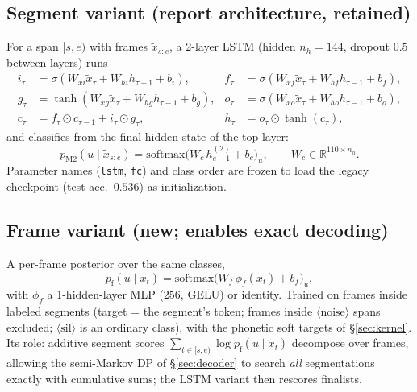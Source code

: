 \documentclass[10pt]{article}
\newcommand{\R}{\mathbb{R}}
\newcommand{\sil}{\langle\mathrm{sil}\rangle}
\newcommand{\noise}{\langle\mathrm{noise}\rangle}
\newcommand{\softmax}{\mathrm{softmax}}
\begin{document}
\subsection{Segment variant (report architecture, retained)}
For a span $[s, e)$ with frames $\tilde x_{s:e}$, a 2-layer LSTM (hidden $n_h = 144$, dropout $0.5$ between layers) runs
\begin{align}
i_\tau &= \sigma(W_{xi}\tilde x_\tau + W_{hi} h_{\tau-1} + b_i), &
f_\tau &= \sigma(W_{xf}\tilde x_\tau + W_{hf} h_{\tau-1} + b_f), \nonumber\\
g_\tau &= \tanh(W_{xg}\tilde x_\tau + W_{hg} h_{\tau-1} + b_g), &
o_\tau &= \sigma(W_{xo}\tilde x_\tau + W_{ho} h_{\tau-1} + b_o), \\
c_\tau &= f_\tau \odot c_{\tau-1} + i_\tau \odot g_\tau, &
h_\tau &= o_\tau \odot \tanh(c_\tau), \nonumber
\end{align}
and classifies from the final hidden state of the top layer:
\begin{equation}
p_{\mathrm{M2}}(u \mid \tilde x_{s:e}) = \softmax\big(W_c\, h^{(2)}_{e-1} + b_c\big)_u, \qquad W_c \in \R^{110 \times n_h}.
\end{equation}
Parameter names (\texttt{lstm}, \texttt{fc}) and class order are frozen to load the legacy checkpoint (test acc.\ $0.536$) as initialization.

\subsection{Frame variant (new; enables exact decoding)}\label{sec:m2f}
A per-frame posterior over the same classes,
\begin{equation}
p_{\mathrm{f}}(u \mid \tilde x_t) = \softmax\big(W_f\, \phi_f(\tilde x_t) + b_f\big)_u,
\end{equation}
with $\phi_f$ a 1-hidden-layer MLP ($256$, GELU) or identity. Trained on frames inside labeled segments (target = the segment's token; frames inside $\noise$ spans excluded; $\sil$ is an ordinary class), with the phonetic soft targets of \S\ref{sec:kernel}. Its role: additive segment scores $\sum_{t \in [s,e)} \log p_{\mathrm{f}}(u \mid \tilde x_t)$ decompose over frames, allowing the semi-Markov DP of \S\ref{sec:decoder} to search \emph{all} segmentations exactly with cumulative sums; the LSTM variant then rescores finalists.
\end{document}

